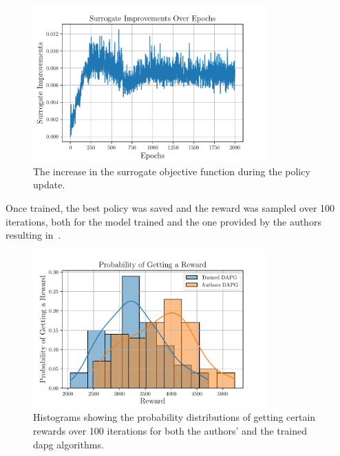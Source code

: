 \begin{figure}[!h]
	\begin{center}
		\includegraphics[width=0.8\textwidth]{chapters/3-in-hand-manipulation/fig/surrogate-improvements-over-epochs.pdf}
	\end{center}
	\caption{The increase in the surrogate objective function during the policy update.}
	\label{fig:surrogate-improvements-over-epochs}
\end{figure}

Once trained, the best policy was saved and the reward was sampled over \num{100} iterations, both for the model trained and the one provided by the authors resulting in~. 

\begin{figure}[!h]
	\begin{center}
		\includegraphics[width=0.8\textwidth]{chapters/3-in-hand-manipulation/fig/probability-of-getting-a-reward.pdf}
	\end{center}
	\caption{Histograms showing the probability distributions of getting certain rewards over 100 iterations for both the authors' and the trained \gls{dapg} algorithms.}
	\label{fig:probability-of-getting-a-reward}
\end{figure}

